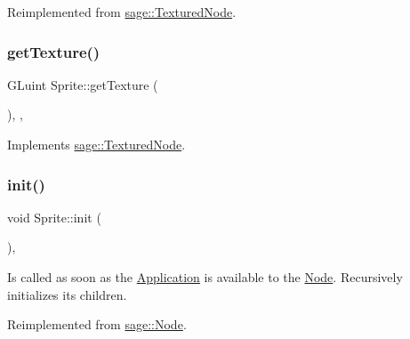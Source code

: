 Reimplemented from \mbox{\hyperlink{classsage_1_1TexturedNode_ada858d240f8074fd97e8a72e74d18a30}{sage\+::\+Textured\+Node}}.

\mbox{\label{classsage_1_1Sprite_aa75f3595b809f99847a9642ce2bf319a}} 
\subsubsection{\texorpdfstring{getTexture()}{getTexture()}}
{\footnotesize\ttfamily G\+Luint Sprite\+::get\+Texture (\begin{DoxyParamCaption}{ }\end{DoxyParamCaption})\hspace{0.3cm}{\ttfamily [override]}, {\ttfamily [protected]}, {\ttfamily [virtual]}}



Implements \mbox{\hyperlink{classsage_1_1TexturedNode_a079cea0b12a1d0e3ea69459546736c0f}{sage\+::\+Textured\+Node}}.

\mbox{\label{classsage_1_1Sprite_aeaf5c7aa5aeff1b0a4da9e66430f1c42}} 
\subsubsection{\texorpdfstring{init()}{init()}}
{\footnotesize\ttfamily void Sprite\+::init (\begin{DoxyParamCaption}{ }\end{DoxyParamCaption})\hspace{0.3cm}{\ttfamily [override]}, {\ttfamily [virtual]}}



Is called as soon as the \mbox{\hyperlink{classsage_1_1Application}{Application}} is available to the \mbox{\hyperlink{classsage_1_1Node}{Node}}. Recursively initializes its children. 



Reimplemented from \mbox{\hyperlink{classsage_1_1Node_ab87776adae83149e235e37ed469f4e10}{sage\+::\+Node}}.

\mbox{\label{classsage_1_1Sprite_ada2cb241cf1fc71378372d04f19926e2}} 
